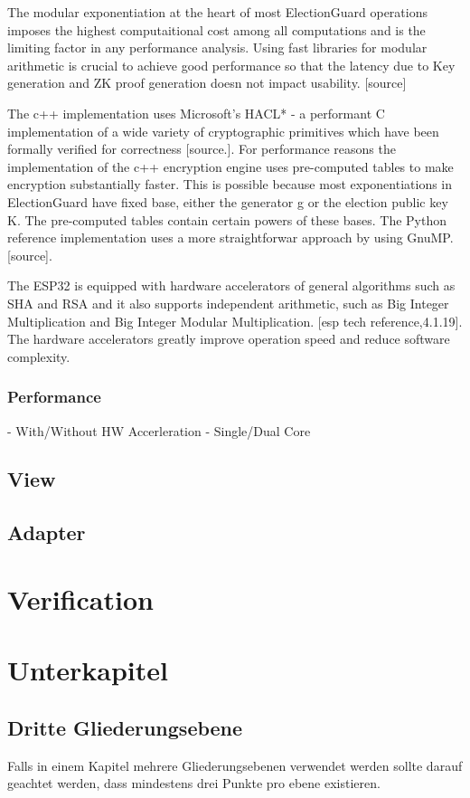 The modular exponentiation at the heart of most ElectionGuard operations imposes the highest computaitional cost among all computations and is the limiting factor in any performance analysis. Using fast libraries for modular arithmetic is crucial to achieve good performance so that the latency due to Key generation and ZK proof generation doesn not impact usability. [source]

The c++ implementation uses Microsoft's HACL* - a performant C implementation of a wide variety of cryptographic primitives which have been formally verified for correctness [source.]. For performance reasons the implementation of the c++ encryption engine  uses pre-computed tables to make encryption substantially faster. This is possible because most exponentiations in ElectionGuard have fixed base, either the generator g or the election public key K. The pre-computed tables contain certain powers of these bases. The Python reference implementation uses a more straightforwar approach by using GnuMP. [source].

The ESP32 is equipped with hardware accelerators of general algorithms such as SHA and RSA and it also supports independent arithmetic, such as Big Integer Multiplication and Big Integer Modular Multiplication. [esp tech reference,4.1.19]. The hardware accelerators greatly improve operation speed and reduce software complexity. 

\subsubsection{Performance}
- With/Without HW Accerleration
- Single/Dual Core
\subsection{View}
\subsection{Adapter}

\section{Verification}



\section{Unterkapitel}
\subsection{Dritte Gliederungsebene}
Falls in einem Kapitel mehrere Gliederungsebenen verwendet werden sollte darauf geachtet werden, dass mindestens drei Punkte pro ebene existieren. 

